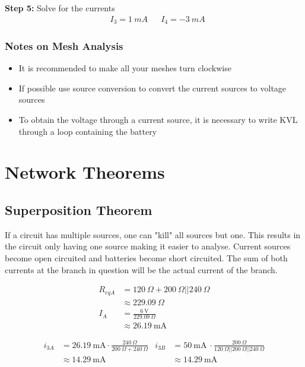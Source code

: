 \documentclass{template}
\begin{document}
\textbf{Step 5:} Solve for the currents %
\begin{align*}
    &I_3 = 1 \: mA &&I_4 = -3 \: mA
\end{align*}

\subsubsection*{Notes on Mesh Analysis} %
\begin {itemize}
    \item It is recommended to make all your meshes turn clockwise
    \item If possible use source conversion to convert the current sources to voltage sources
    \item To obtain the voltage through a current source, it is necessary to write KVL through a loop containing the battery
\end{itemize}

\newpage
\section{Network Theorems}
\subsection{Superposition Theorem}

If a circuit has multiple sources, one can "kill" all sources but one. This results in the circuit only having one source making it easier to analyse. Current sources become open circuited and batteries become short circuited. The sum of both currents at the branch in question will be the actual current of the branch.


\begin{align*}
    R_{eqA} &= 120 \ \Omega + 200 \ \Omega || 240 \ \Omega \\
            &\approx 229.09 \ \Omega \\
    I_A &= \frac{6 \ \text{V}}{229.09 \ \Omega} \\
        &\approx \SI{26.19}{\milli\ampere}
\end{align*}

\begin{align*}
    i_{3A}  &= \SI{26.19}{\milli\ampere}  \cdot \frac{240 \ \Omega}{200 \ \Omega + 240 \ \Omega} & i_{3B}  &= \SI{50}{\milli\ampere} \ \cdot \frac{200 \ \Omega}{120 \ \Omega || 200 \ \Omega || 240 \ \Omega} \\
    &\approx \SI{14.29}{\milli\ampere} & &\approx \SI{14.29}{\milli\ampere}
\end{align*}
\end{document}
